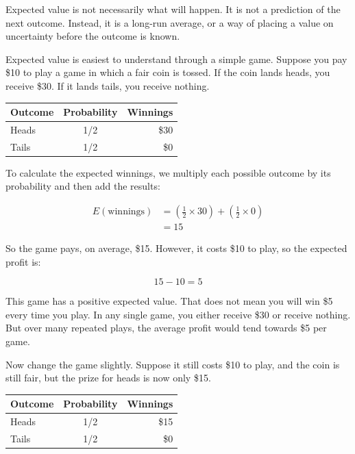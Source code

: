 \documentclass[
  letterpaper,
  DIV=11,
  numbers=noendperiod]{scrreprt}
\begin{document}
Expected value is not necessarily what will happen. It is not a
prediction of the next outcome. Instead, it is a long-run average, or a
way of placing a value on uncertainty before the outcome is known.

Expected value is easiest to understand through a simple game. Suppose
you pay \$10 to play a game in which a fair coin is tossed. If the coin
lands heads, you receive \$30. If it lands tails, you receive nothing.

\begin{table}
\fontsize{12.0pt}{14.0pt}\selectfont
\begin{tabular*}{\linewidth}{@{\extracolsep{\fill}}lcr}
\toprule
Outcome & Probability & Winnings \\ 
\midrule\addlinespace[2.5pt]
Heads & 1/2 & \$30 \\ 
Tails & 1/2 & \$0 \\ 
\bottomrule
\end{tabular*}
\end{table}

To calculate the expected winnings, we multiply each possible outcome by
its probability and then add the results:

\[
\begin{aligned}
E(\text{winnings})
&=
\left(\frac{1}{2}\times 30\right)
+
\left(\frac{1}{2}\times 0\right) \\
&= 15
\end{aligned}
\]

So the game pays, on average, \$15. However, it costs \$10 to play, so
the expected profit is:

\[
15 - 10 = 5
\]

This game has a positive expected value. That does not mean you will win
\$5 every time you play. In any single game, you either receive \$30 or
receive nothing. But over many repeated plays, the average profit would
tend towards \$5 per game.

Now change the game slightly. Suppose it still costs \$10 to play, and
the coin is still fair, but the prize for heads is now only \$15.

\begin{table}
\fontsize{12.0pt}{14.0pt}\selectfont
\begin{tabular*}{\linewidth}{@{\extracolsep{\fill}}lcr}
\toprule
Outcome & Probability & Winnings \\ 
\midrule\addlinespace[2.5pt]
Heads & 1/2 & \$15 \\ 
Tails & 1/2 & \$0 \\ 
\bottomrule
\end{tabular*}
\end{table}
\end{document}
